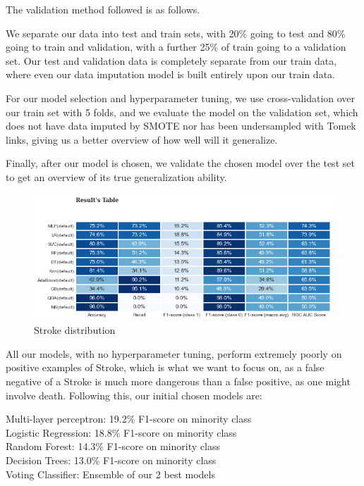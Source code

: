 \documentclass[11pt, a4paper]{article}
\begin{document}
The validation method followed is as follows. 

We separate our data into test and train sets, with 20\% going to test and 80\% going to train and validation, with a further 25\% of train going to a validation set. Our test and validation data is completely separate from our train data, where even our data imputation model is built entirely upon our train data. 

For our model selection and hyperparameter tuning, we use cross-validation over our train set with 5 folds, and we evaluate the model on the validation set, which does not have data imputed by SMOTE nor has been undersampled with Tomek links, giving us a better overview of how well will it generalize. 

Finally, after our model is chosen, we validate the chosen model over the test set to get an overview of its true generalization ability.


\begin{figure}[H]
    \centering
    \includegraphics[width=\textwidth]{images/Accuracies.png}
    \caption{Stroke distribution}
    \label{fig:accuracies}
\end{figure}

All our models, with no hyperparameter tuning, perform extremely poorly on positive examples of Stroke, which is what we want to focus on, as a false negative of a Stroke is much more dangerous than a false positive, as one might involve death. Following this, our initial chosen models are:

Multi-layer perceptron: 19.2\% F1-score on minority class \\
Logistic Regression: 18.8\% F1-score on minority class \\
Random Forest:  14.3\% F1-score on minority class \\
Decision Trees: 13.0\% F1-score on minority class \\
Voting Classifier: Ensemble of our 2 best models\\
\end{document}
